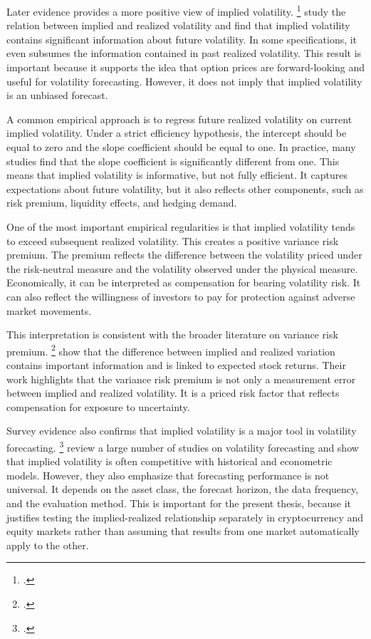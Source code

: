 \documentclass[11pt,a4paper,openany]{report}
\newcommand{\fcitet}[1]{\citet{#1}\footnote{\bibentry{#1}.}}
\begin{document}
Later evidence provides a more positive view of implied volatility.
\fcitet{christensen1998} study the
relation between implied and realized volatility and find that implied
volatility contains significant information about future volatility. In
some specifications, it even subsumes the information contained in past
realized volatility. This result is important because it supports the
idea that option prices are forward-looking and useful for volatility
forecasting. However, it does not imply that implied volatility is an
unbiased forecast.

A common empirical approach is to regress future realized volatility on
current implied volatility. Under a strict efficiency hypothesis, the
intercept should be equal to zero and the slope coefficient should be
equal to one. In practice, many studies find that the slope coefficient
is significantly different from one. This means that implied volatility
is informative, but not fully efficient. It captures expectations about
future volatility, but it also reflects other components, such as risk
premium, liquidity effects, and hedging demand.

One of the most important empirical regularities is that implied
volatility tends to exceed subsequent realized volatility. This creates
a positive variance risk premium. The premium reflects the difference
between the volatility priced under the risk-neutral measure and the
volatility observed under the physical measure. Economically, it can be
interpreted as compensation for bearing volatility risk. It can also
reflect the willingness of investors to pay for protection against
adverse market movements.

This interpretation is consistent with the broader literature on
variance risk premium. \fcitet{bollerslev2009} show that the difference between implied and realized
variation contains important information and is linked to expected stock
returns. Their work highlights that the variance risk premium is not
only a measurement error between implied and realized volatility. It is
a priced risk factor that reflects compensation for exposure to
uncertainty.

Survey evidence also confirms that implied volatility is a major tool in
volatility forecasting. \fcitet{poon2003}
review a large number of studies on volatility forecasting and show that
implied volatility is often competitive with historical and econometric
models. However, they also emphasize that forecasting performance is not
universal. It depends on the asset class, the forecast horizon, the data
frequency, and the evaluation method. This is important for the present
thesis, because it justifies testing the implied-realized relationship
separately in cryptocurrency and equity markets rather than assuming
that results from one market automatically apply to the other.
\end{document}
